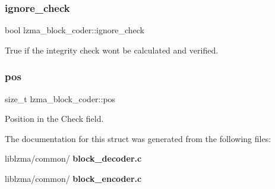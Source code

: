 \mbox{\label{structlzma__block__coder_a4f1f71a49e3985d29de10e927a1a23b8}} 
\subsubsection{ignore\+\_\+check}
{\footnotesize\ttfamily bool lzma\+\_\+block\+\_\+coder\+::ignore\+\_\+check}



True if the integrity check won\textquotesingle{}t be calculated and verified. 

\mbox{\label{structlzma__block__coder_ab3d31683916ce485c8ff0a4060b35b02}} 
\subsubsection{pos}
{\footnotesize\ttfamily size\+\_\+t lzma\+\_\+block\+\_\+coder\+::pos}



Position in the Check field. 



The documentation for this struct was generated from the following files\+:\begin{DoxyCompactItemize}
\item 
liblzma/common/\textbf{ block\+\_\+decoder.\+c}\item 
liblzma/common/\textbf{ block\+\_\+encoder.\+c}\end{DoxyCompactItemize}
